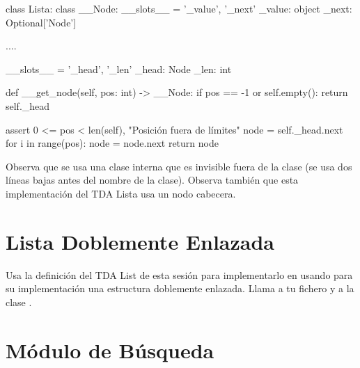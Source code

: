 \begin{pyverbatim}[][frame=single]
class Lista:
    class __Node:
        __slots__ = '_value', '_next'
        _value: object
        _next: Optional['Node']
        
        ....

    __slots__ = '_head', '_len'
    _head: Node
    _len: int

    def __get_node(self, pos: int) -> __Node:
        if pos == -1 or self.empty():
            return self._head

        assert 0 <= pos < len(self), "Posición fuera de límites"
        node = self._head.next
        for i in range(pos): 
            node = node.next
        return node
\end{pyverbatim}
        
Observa que se usa una clase interna que es invisible fuera de la clase (se usa dos líneas bajas antes del nombre de la clase). Observa también que esta implementación del TDA Lista usa un nodo cabecera.




%



\separacion
\section{Lista Doblemente Enlazada} 

Usa la definición del TDA List de esta sesión para implementarlo
en  usando para su implementación una estructura doblemente enlazada.
Llama a tu fichero  y a la clase .


%





\separacion
\section{Módulo de Búsqueda} \label{sec:moduloBusqueda}

